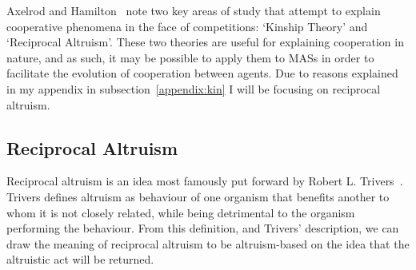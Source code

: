 \documentclass[]{final_report}
\begin{document}
Axelrod and Hamilton~\cite{evolution_of_cooperation} note two key areas of study that attempt to explain cooperative phenomena in the face of competitions: `Kinship Theory' and `Reciprocal Altruism'. These two theories are useful for explaining cooperation in nature, and as such, it may be possible to apply them to MASs in order to facilitate the evolution of cooperation between agents. Due to reasons explained in my appendix in subsection~\ref{appendix:kin} I will be focusing on reciprocal altruism.

\subsection{Reciprocal Altruism}
Reciprocal altruism is an idea most famously put forward by Robert L. Trivers~\cite{trivers1971evolution}. Trivers defines altruism as behaviour of one organism that benefits another to whom it is not closely related, while being detrimental to the organism performing the behaviour. From this definition, and Trivers' description, we can draw the meaning of reciprocal altruism to be altruism-based on the idea that the altruistic act will be returned.
\end{document}
